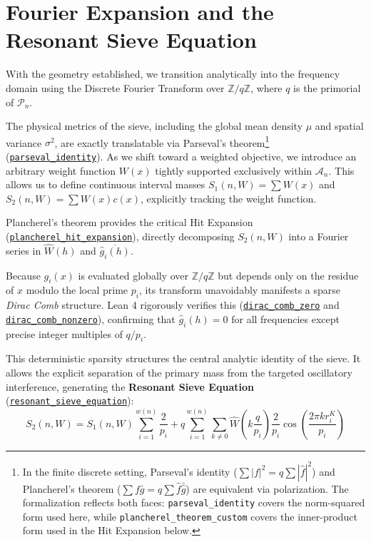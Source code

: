 \documentclass[lean]{AFM}
\renewcommand{\.}{\hskip .75pt}
\def\urlpfx{https://github.com/ElNando888/KrafftSieve/blob/v1.0}
\begin{document}
\section{Fourier Expansion and the Resonant Sieve Equation} \label{resonance}

With the geometry established, we transition analytically into the frequency domain using the
Discrete Fourier Transform over $\mathbb{Z}/q\mathbb{Z}$, where $q$ is the primorial of
$\mathcal{P}_n$. 

The physical metrics of the sieve, including the global mean density $\mu$ and spatial variance
$\sigma^2$, are exactly translatable via Parseval's theorem\footnote{In the finite discrete
setting, Parseval's identity ($\sum |f|^2 = q\sum |\hat{f}|^2$) and Plancherel's theorem
($\sum f\bar{g} = q\sum \hat{f}\bar{\hat{g}}$) are equivalent via polarization. The
formalization reflects both faces: \texttt{parseval\_identity} covers the norm-squared form
used here, while \texttt{plancherel\_theorem\_custom} covers the inner-product form used in
the Hit Expansion below.}
(\href{\urlpfx/KrafftSieve/Variance.lean#L224}{\texttt{parseval\_identity}}). As we shift toward
a weighted objective, we introduce an arbitrary weight function $W(x)$ tightly supported
exclusively within $\mathcal{A}_n$. This allows us to define continuous interval masses
$S_1(n, W) = \sum W(x)$ and $S_2(n, W) = \sum W(x)c(x)$, explicitly tracking the weight function.

Plancherel's theorem provides the critical Hit Expansion
(\href{\urlpfx/KrafftSieve/ThirdHarmonic.lean#L192}{\texttt{plancherel\_hit\_expansion}}),
directly decomposing $S_2(n, W)$ into a Fourier series in $\hat{W}(h)$ and
$\overline{\hat{g}_i(h)}$.

Because $g_i(x)$ is evaluated globally over $\mathbb{Z}/q\mathbb{Z}$ but depends only on the
residue of $x$ modulo the local prime $p_i$, its transform unavoidably manifests a sparse
\textit{Dirac Comb} structure. Lean 4 rigorously verifies this
(\href{\urlpfx/KrafftSieve/ThirdHarmonic.lean#L438}{\texttt{dirac\_comb\_zero}} and
\href{\urlpfx/KrafftSieve/ThirdHarmonic.lean#L215}{\texttt{dirac\_comb\_nonzero}}), confirming that
$\hat{g}_i(h) = 0$ for all frequencies except precise integer multiples of $q/p_i$.

This deterministic sparsity structures the central analytic identity of the sieve. It allows the
explicit separation of the primary mass from the targeted oscillatory interference, generating the
\textbf{Resonant Sieve Equation} (\href{\urlpfx/KrafftSieve/ThirdHarmonic.lean#L614}
{\texttt{resonant\_sieve\_equation}}):
$$ S_2(n, W) = S_1(n, W) \sum_{i=1}^{w(n)} \frac{2}{p_i} + q \sum_{i=1}^{w(n)} \sum_{k \neq 0}
\hat{W}\!\left(k \frac{q}{p_i}\right) \frac{2}{p_i} \cos\!\left( \frac{2 \pi k r^K_i}{p_i} \right) $$
\end{document}
